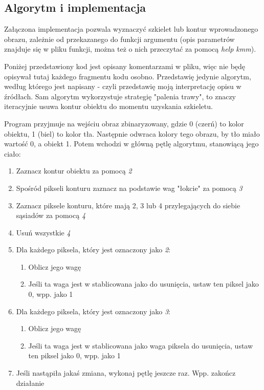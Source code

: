 \documentclass[11pt]{article}
\begin{document}
\subsection{Algorytm i implementacja}
\par
Załączona implementacja pozwala wyznaczyć szkielet lub kontur wprowadzonego obrazu, zależnie od przekazanego do funkcji argumentu (opis parametrów znajduje się w pliku funkcji, można też o nich przeczytać za pomocą \textit{help kmm}).
\par
Poniżej przedstawiony kod jest opisany komentarzami w pliku, więc nie będę opisywał tutaj każdego fragmentu kodu osobno. Przedstawię jedynie algorytm, według którego jest napisany - czyli przedstawię moją interpretację opisu w źródłach. Sam algorytm wykorzystuje strategię "palenia trawy", to znaczy iteracyjnie usuwa kontur obiektu do momentu uzyskania szkieletu.
\par
Program przyjmuje na wejściu obraz zbinaryzowany, gdzie 0 (czerń) to kolor obiektu, 1 (biel) to kolor tła. Następnie odwraca kolory tego obrazu, by tło miało wartość 0, a obiekt 1. Potem wchodzi w główną pętlę algorytmu, stanowiącą jego ciało:
\begin{enumerate}
\item Zaznacz kontur obiektu za pomocą \textit{2}
\item Spośród pikseli konturu zaznacz na podstawie wag "łokcie" za pomocą \textit{3}
\item Zaznacz piksele konturu, które mają 2, 3 lub 4 przylegających do siebie sąsiadów za pomocą \textit{4}
\item Usuń wszystkie \textit{4}
\item Dla każdego piksela, który jest oznaczony jako \textit{2}:
	\begin{enumerate}
	\item Oblicz jego wagę
	\item Jeśli ta waga jest w stablicowana jako do usunięcia, ustaw ten piksel jako 0, wpp. jako 1
	\end{enumerate}
\item Dla każdego piksela, który jest oznaczony jako \textit{3}:
	\begin{enumerate}
	\item Oblicz jego wagę
	\item Jeśli ta waga jest w stablicowana jako waga piksela do usunięcia, ustaw ten piksel jako 0, wpp. jako 1
	\end{enumerate} 
\item Jeśli nastąpiła jakaś zmiana, wykonaj pętlę jeszcze raz. Wpp. zakończ działanie
\end{enumerate}
\end{document}
